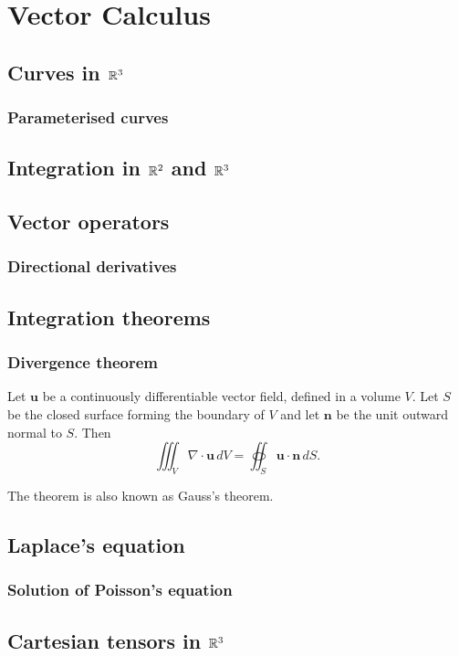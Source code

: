 \documentclass[main.tex]{subfiles}
\begin{document}
	\chapter{Vector Calculus}
		\section{Curves in $\mathbb R^3$}
		\subsection{Parameterised curves}
		
		\section{Integration in $\mathbb R^2$ and $\mathbb R^3$}
		
		\section{Vector operators}
		\subsection{Directional derivatives}
		
		\section{Integration theorems}
		\subsection{Divergence theorem}
		\begin{theorem}
			Let $\mathbf{u}$ be a continuously differentiable vector field, defined in a volume $V$. Let $S$ be the closed surface forming the boundary of $V$ and let $\mathbf{n}$ be the unit outward normal to $S$. Then
			\begin{equation*}
				\iiint_V \nabla \cdot \mathbf{u}\, dV = \oiint_S \mathbf{u}\cdot \mathbf n\, dS.
			\end{equation*}
		\end{theorem}
		The theorem is also known as Gauss's theorem.
		
		\section{Laplace's equation}
		\subsection{Solution of Poisson's equation}
		\section{Cartesian tensors in $\mathbb R^3$}
\end{document}
